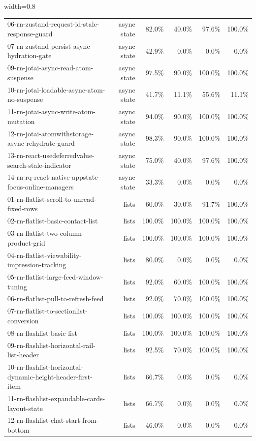 \begin{table}[htbp]
\begin{adjustbox}{width=0.8\textwidth}
\begin{tabular}{lrrrrr}
06-rn-zustand-request-id-stale-response-guard & async state & 82.0\% & 40.0\% & 97.6\% & 100.0\% \\
07-rn-zustand-persist-async-hydration-gate & async state & 42.9\% & 0.0\% & 0.0\% & 0.0\% \\
09-rn-jotai-async-read-atom-suspense & async state & 97.5\% & 90.0\% & 100.0\% & 100.0\% \\
10-rn-jotai-loadable-async-atom-no-suspense & async state & 41.7\% & 11.1\% & 55.6\% & 11.1\% \\
11-rn-jotai-async-write-atom-mutation & async state & 94.0\% & 90.0\% & 100.0\% & 100.0\% \\
12-rn-jotai-atomwithstorage-async-rehydrate-guard & async state & 98.3\% & 90.0\% & 100.0\% & 100.0\% \\
13-rn-react-usedeferredvalue-search-stale-indicator & async state & 75.0\% & 40.0\% & 97.6\% & 100.0\% \\
14-rn-rq-react-native-appstate-focus-online-managers & async state & 33.3\% & 0.0\% & 0.0\% & 0.0\% \\
01-rn-flatlist-scroll-to-unread-fixed-rows & lists & 60.0\% & 30.0\% & 91.7\% & 100.0\% \\
02-rn-flatlist-basic-contact-list & lists & 100.0\% & 100.0\% & 100.0\% & 100.0\% \\
03-rn-flatlist-two-column-product-grid & lists & 100.0\% & 100.0\% & 100.0\% & 100.0\% \\
04-rn-flatlist-viewability-impression-tracking & lists & 80.0\% & 0.0\% & 0.0\% & 0.0\% \\
05-rn-flatlist-large-feed-window-tuning & lists & 92.0\% & 60.0\% & 100.0\% & 100.0\% \\
06-rn-flatlist-pull-to-refresh-feed & lists & 92.0\% & 70.0\% & 100.0\% & 100.0\% \\
07-rn-flatlist-to-sectionlist-conversion & lists & 100.0\% & 100.0\% & 100.0\% & 100.0\% \\
08-rn-flashlist-basic-list & lists & 100.0\% & 100.0\% & 100.0\% & 100.0\% \\
09-rn-flashlist-horizontal-rail-list-header & lists & 92.5\% & 70.0\% & 100.0\% & 100.0\% \\
10-rn-flashlist-horizontal-dynamic-height-header-first-item & lists & 66.7\% & 0.0\% & 0.0\% & 0.0\% \\
11-rn-flashlist-expandable-cards-layout-state & lists & 66.7\% & 0.0\% & 0.0\% & 0.0\% \\
12-rn-flashlist-chat-start-from-bottom & lists & 46.0\% & 0.0\% & 0.0\% & 0.0\% \\

\end{tabular}
\end{adjustbox}
\end{table}
